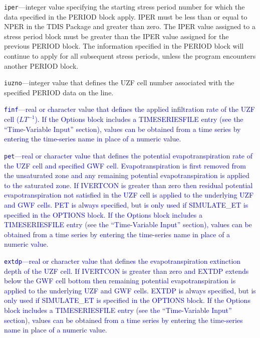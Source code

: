 \begin{description}
\item \texttt{iper}---integer value specifying the starting stress period number for which the data specified in the PERIOD block apply.  IPER must be less than or equal to NPER in the TDIS Package and greater than zero.  The IPER value assigned to a stress period block must be greater than the IPER value assigned for the previous PERIOD block.  The information specified in the PERIOD block will continue to apply for all subsequent stress periods, unless the program encounters another PERIOD block.

\item \texttt{iuzno}---integer value that defines the UZF cell number associated with the specified PERIOD data on the line.

\item \textcolor{blue}{\texttt{finf}---real or character value that defines the applied infiltration rate of the UZF cell ($LT^{-1}$). If the Options block includes a TIMESERIESFILE entry (see the ``Time-Variable Input'' section), values can be obtained from a time series by entering the time-series name in place of a numeric value.}

\item \textcolor{blue}{\texttt{pet}---real or character value that defines the potential evapotranspiration rate of the UZF cell and specified GWF cell. Evapotranspiration is first removed from the unsaturated zone and any remaining potential evapotranspiration is applied to the saturated zone. If IVERTCON is greater than zero then residual potential evapotranspiration not satisfied in the UZF cell is applied to the underlying UZF and GWF cells. PET is always specified, but is only used if SIMULATE\_ET is specified in the OPTIONS block. If the Options block includes a TIMESERIESFILE entry (see the ``Time-Variable Input'' section), values can be obtained from a time series by entering the time-series name in place of a numeric value.}

\item \textcolor{blue}{\texttt{extdp}---real or character value that defines the evapotranspiration extinction depth of the UZF cell. If IVERTCON is greater than zero and EXTDP extends below the GWF cell bottom then remaining potential evapotranspiration is applied to the underlying UZF and GWF cells. EXTDP is always specified, but is only used if SIMULATE\_ET is specified in the OPTIONS block. If the Options block includes a TIMESERIESFILE entry (see the ``Time-Variable Input'' section), values can be obtained from a time series by entering the time-series name in place of a numeric value.}


\end{description}
